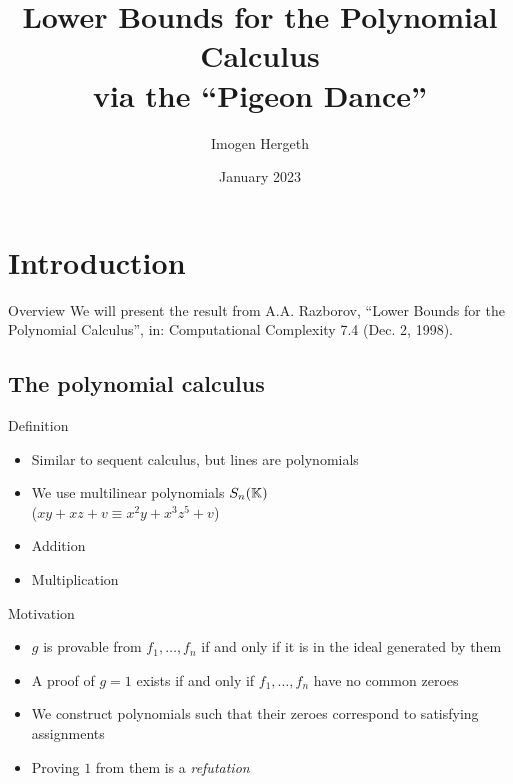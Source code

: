 \documentclass[xcolor={dvipsnames}, aspectratio=169]{beamer}
\title{Lower Bounds for the Polynomial Calculus\\via the ``Pigeon Dance''}
\author{Imogen Hergeth}
\date{January 2023}
\newcommand{\Sn}{S_n(\KK)}
\begin{document}
\maketitle

\section{Introduction}

\begin{frame}{Overview}
    We will present the result from A.A. Razborov, ``Lower Bounds for the Polynomial Calculus'',
    in: Computational Complexity 7.4 (Dec. 2, 1998).

    \tableofcontents[hideallsubsections]
\end{frame}

\subsection{The polynomial calculus}
\begin{frame}{Definition}
    \begin{itemize}[<+->]
        \item Similar to sequent calculus, but lines are polynomials
        \item We use multilinear polynomials $\Sn$\\
            ($xy + xz + v \equiv x^2y + x^3z^5 + v$)
        \item Addition
        \begin{prooftree}
        \end{prooftree}
        \item Multiplication
        \begin{prooftree}
        \end{prooftree}
    \end{itemize}
\end{frame}

\begin{frame}{Motivation}
    \begin{itemize}[<+->]
        \item $g$ is provable from $f_1, \ldots, f_n$ if and only if it is in the ideal generated by them
        \item A proof of $g=1$ exists if and only if $f_1, \ldots, f_n$ have no common zeroes
        \item We construct polynomials such that their zeroes correspond to satisfying assignments
        \item Proving $1$ from them is a \textit{refutation}
    \end{itemize}
\end{frame}
\end{document}
